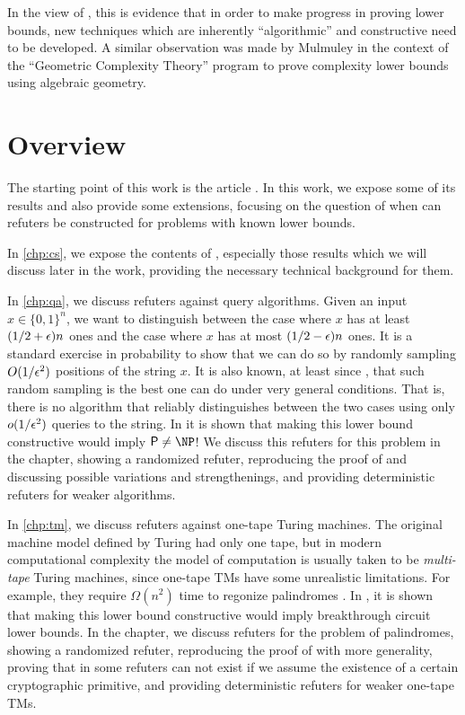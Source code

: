 In the view of \cite{ConstructiveSeparations}, this is evidence that in order to make progress
in proving lower bounds, new techniques which are inherently ``algorithmic'' 
and constructive need to be developed. A similar observation was made by Mulmuley 
\cite{Mulmuley10} in the context of the ``Geometric Complexity Theory'' program 
to prove complexity lower bounds using algebraic geometry. 

\section{Overview}

The starting point of this work is the article \cite{ConstructiveSeparations}. In this work,
we expose some of its results and also provide some extensions, focusing on the question of
when can refuters be constructed for problems with known lower bounds.

In \cref{chp:cs}, we expose the contents of \cite{ConstructiveSeparations}, especially those
results which we will discuss later in the work, providing the necessary technical background 
for them. 

In \cref{chp:qa}, we discuss refuters against query algorithms. 
Given an input $x \in \{0, 1\}^n$, we want to distinguish between the case where $x$ has at
least $(1/2 + \epsilon)n$ ones and the case where $x$ has at most $(1/2 - \epsilon)n$ ones. 
It is a standard exercise in probability to show that we can do so by randomly sampling $O(1/\epsilon^2)$
positions of the string $x$. It is also known, at least since \cite{Canetti95}, that such
random sampling is the best one can do under very general conditions. That is, there is no
algorithm that reliably distinguishes between the two cases using only $o(1/\epsilon^2)$ queries
to the string. In \cite{ConstructiveSeparations} it is shown that making this lower bound
constructive would imply $\PTIME \neq \NP$! We discuss this refuters for this
problem in the chapter, showing a 
randomized refuter, reproducing the proof of \cite{ConstructiveSeparations} and discussing
possible variations and strengthenings, and providing deterministic refuters for weaker algorithms. 

In \cref{chp:tm}, we discuss refuters against one-tape Turing machines. 
The original machine model defined by Turing \cite{Turing36} had only one tape, 
but in modern computational complexity the model of computation is usually taken
to be \emph{multi-tape} Turing machines, since one-tape TMs have some 
unrealistic limitations.
For example, they require $\Omega(n^2)$ time to regonize palindromes \cite{Hennie65}. 
In \cite{ConstructiveSeparations}, it is shown that making this lower bound constructive
would imply breakthrough circuit lower bounds. In the chapter, we discuss refuters
for the problem of palindromes, showing a randomized refuter, reproducing the proof of 
\cite{ConstructiveSeparations} with more generality, proving that in some refuters 
can not exist if we assume the existence of a certain cryptographic primitive, 
and providing deterministic refuters for weaker one-tape TMs. 


